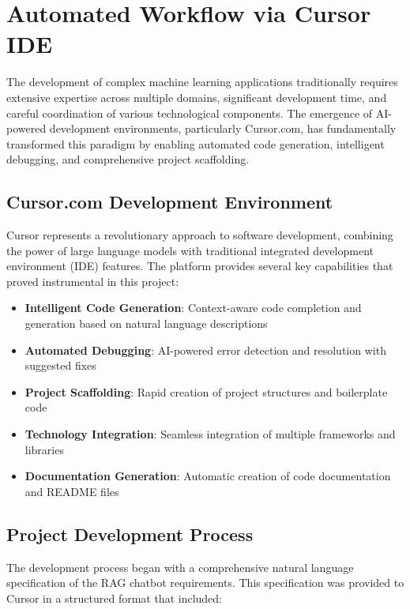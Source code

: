 \documentclass[12pt,letterpaper]{article}
\begin{document}
\newpage

\section{Automated Workflow via Cursor IDE}

The development of complex machine learning applications traditionally requires extensive expertise across multiple domains, significant development time, and careful coordination of various technological components. The emergence of AI-powered development environments, particularly Cursor.com, has fundamentally transformed this paradigm by enabling automated code generation, intelligent debugging, and comprehensive project scaffolding.

\subsection{Cursor.com Development Environment}

Cursor represents a revolutionary approach to software development, combining the power of large language models with traditional integrated development environment (IDE) features. The platform provides several key capabilities that proved instrumental in this project:

\begin{itemize}
    \item \textbf{Intelligent Code Generation}: Context-aware code completion and generation based on natural language descriptions
    \item \textbf{Automated Debugging}: AI-powered error detection and resolution with suggested fixes
    \item \textbf{Project Scaffolding}: Rapid creation of project structures and boilerplate code
    \item \textbf{Technology Integration}: Seamless integration of multiple frameworks and libraries
    \item \textbf{Documentation Generation}: Automatic creation of code documentation and README files
\end{itemize}

\subsection{Project Development Process}

The development process began with a comprehensive natural language specification of the RAG chatbot requirements. This specification was provided to Cursor in a structured format that included:
\end{document}
